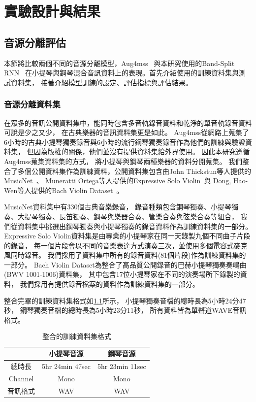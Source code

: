 \documentclass[class=NCU_thesis, crop=false]{standalone}
\begin{document}
\chapter{實驗設計與結果}

\section{音源分離評估}
本節將比較兩個不同的音源分離模型，Aug4mss~\cite{Chiu_ChingYu2020MixingSpecific}
與本研究使用的Band-Split RNN~\cite{Luo_Yi2022MusicSourceSeparation}
在小提琴與鋼琴混合音訊資料上的表現。首先介紹使用的訓練資料集與測試資料集，
接著介紹模型訓練的設定、評估指標與評估結果。

\subsection{音源分離資料集}
在眾多的音訊公開資料集中，能同時包含多音軌錄音資料和乾淨的單音軌錄音資料可說是少之又少，
在古典樂器的音訊資料集更是如此。
Aug4mss從網路上蒐集了
6小時的古典小提琴獨奏錄音與6小時的流行鋼琴獨奏錄音作為他們的訓練與驗證資料集，
但因為版權的關係，他們並沒有提供資料集給外界使用。
因此本研究遵循Aug4mss蒐集資料集的方式，
將小提琴與鋼琴兩種樂器的資料分開蒐集。
我們整合了多個公開資料集作為訓練資料，公開資料集包含由John Thickstun等人提供的
MusicNet~\cite{Thickstun2017Learning, Thickstun2018Invariances}、
Muneratti Ortega等人提供的Expressive Solo Violin~\cite{Muneratti_Ortega2021Expressive}與
Dong, Hao-Wen等人提供的Bach Violin Dataset~\cite{Dong_HaoWen2021Bach}。

MusicNet資料集中有330個古典音樂錄音，
錄音種類包含鋼琴獨奏、小提琴獨奏、大提琴獨奏、長笛獨奏、鋼琴與樂器合奏、管樂合奏與弦樂合奏等組合，
我們從資料集中挑選出鋼琴獨奏與小提琴獨奏的錄音資料作為訓練資料集的一部分。
Expressive Solo Violin資料集是由專業的小提琴家在同一天錄製九個不同曲子片段的錄音，
每一個片段會以不同的音樂表達方式演奏三次，並使用多個電容式麥克風同時錄音。
我們採用了資料集中所有的錄音資料(81個片段)作為訓練資料集的一部分。
Bach Violin Dataset為整合了高品質公開錄音的巴赫小提琴獨奏奏鳴曲(BWV 1001-1006)資料集，
其中包含17位小提琴家在不同的演奏場所下錄製的資料，
我們採用有提供錄音檔案的資料作為訓練資料集的一部分。

整合完畢的訓練資料集格式如\cref{table:table-ours-training-dataset}所示，
小提琴獨奏音檔的總時長為5小時24分47秒，
鋼琴獨奏音檔的總時長為5小時23分11秒，
所有資料皆為單聲道WAVE音訊格式。
\begin{table}[h]
    \centering
    \caption{整合的訓練資料集格式}
    \label{table:table-ours-training-dataset}
    \begin{tabular}{|c|c|c|}
        \hline
        \multicolumn{1}{|c|}{} & \multicolumn{1}{|c|}{小提琴音源} & \multicolumn{1}{|c|}{鋼琴音源} \\
        \hline
        總時長 & 5hr 24min 47sec & 5hr 23min 11sec \\
        \hline
        Channel & Mono & Mono \\
        \hline
        音訊格式 & WAV & WAV \\
        \hline
    \end{tabular}
\end{table}
\end{document}
